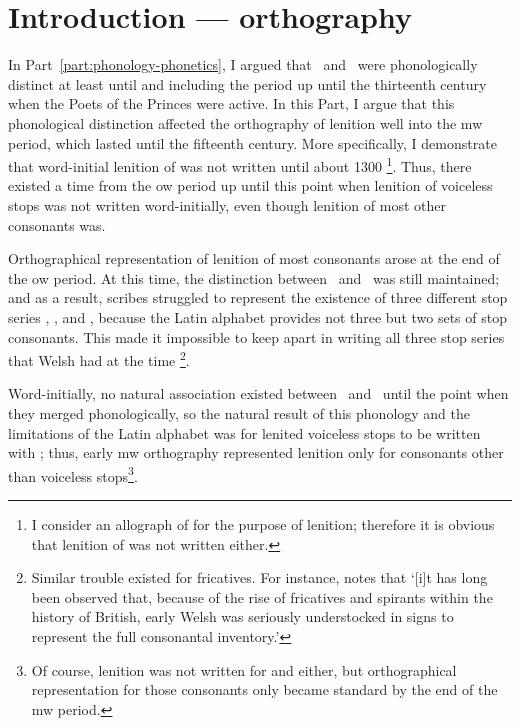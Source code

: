 \chapter{Introduction --- orthography}
\label{cha:intr-orth}

In Part~\ref{part:phonology-phonetics}, I argued that \lT\ and \xD\ were phonologically distinct at least until and including the period up until the thirteenth century when the Poets of the Princes were active. In this Part, I argue that this phonological distinction affected the orthography of lenition well into the \gls{mw} period, which lasted until the fifteenth century. More specifically, I demonstrate that word-initial lenition of  was not written until about 1300%
\footnote{I consider  an allograph of  for the purpose of lenition; therefore it is obvious that lenition of  was not written either.}.
Thus, there existed a time from the \gls{ow} period up until this point when lenition of  voiceless stops was not written word-initially, even though lenition of most other consonants was.

Orthographical representation of lenition of most consonants arose at the end of the \gls{ow} period. At this time, the distinction between \lT\ and \xD\ was still maintained; and as a result, scribes struggled to represent the existence of three different stop series \xT, \lT, and \xD, because the Latin alphabet  provides not three but two sets of stop consonants. This made it impossible to keep apart in writing all three stop series that Welsh had at the time%
\footnote{Similar trouble existed for fricatives. For instance, \textcite[28]{russell_rowynniauc_2003} notes that `[i]t has long been observed that, because of the rise of fricatives and spirants within the history of British, early Welsh was seriously understocked in signs to represent the full consonantal inventory.'}.

Word-initially, no natural association existed between \lT\ and \xD\ until the point when they merged phonologically, so the natural result of this phonology and the limitations of the Latin alphabet was for lenited voiceless stops to be written with ; thus, early \gls{mw} orthography represented lenition only for consonants other than voiceless stops\footnote{Of course, lenition was not written for  and  either, but orthographical representation for those consonants only became standard by the end of the \gls{mw} period.}.

